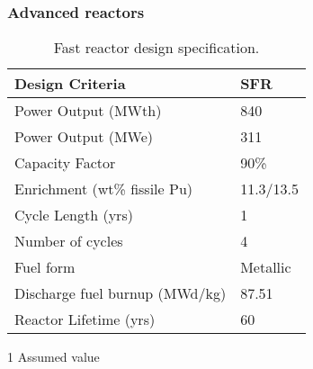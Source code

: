 \begin{frame}
    \frametitle{Advanced reactors}
    \vspace{-0.7cm}
    \begingroup
        \renewcommand{\arraystretch}{1.5}
        \begin{table}
            \centering
            \begin{threeparttable}
        
            \caption{Fast reactor design specification.}
            \label{tab:fast_rx}
            \begin{tabular}{l l}
                \hline
                Design Criteria & SFR \cite{triplett_prism:_2012,fichtlscherer_assessing_2019}\\
                \hline
                Power Output (MWth) & 840 \\
                Power Output (MWe) & 311 \\
                Capacity Factor & 90\%\tnote{1} \\
                Enrichment (wt\% fissile Pu) &  11.3/13.5\\
                Cycle Length (yrs) & 1 \\
                Number of cycles &  4\\
                Fuel form &  Metallic \\
                Discharge fuel burnup (MWd/kg) & 87.51 \\
                Reactor Lifetime (yrs)&  60\\
                \hline
            \end{tabular}
            \begin{tablenotes}
                \item [1] Assumed value
            \end{tablenotes}
        \end{threeparttable}
        \end{table} 
    \endgroup
\end{frame}
